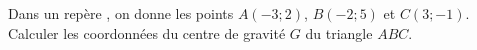 
Dans un repère \Oij, on donne les points $A(-3;2)$, $B(-2;5)$ et $C(3;-1)$.
Calculer les coordonnées du centre de gravité $G$ du triangle $ABC$. 